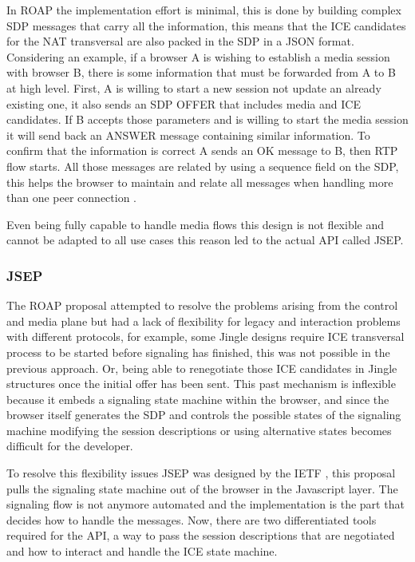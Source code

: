 In ROAP the implementation effort is minimal, this is done by building complex SDP messages that carry all the information, this means that the ICE candidates for the NAT transversal are also packed in the SDP in a JSON format. Considering an example, if a browser A is wishing to establish a media session with browser B, there is some information that must be forwarded from A to B at high level. First, A is willing to start a new session not update an already existing one, it also sends an SDP OFFER that includes media and ICE candidates. If B accepts those parameters and is willing to start the media session it will send back an ANSWER message containing similar information. To confirm that the information is correct A sends an OK message to B, then RTP flow starts. All those messages are related by using a sequence field on the SDP, this helps the browser to maintain and relate all messages when handling more than one peer connection \cite{roapIETF}.

Even being fully capable to handle media flows this design is not flexible and cannot be adapted to all use cases this reason led to the actual API called JSEP.

\subsubsection{JSEP}
The ROAP proposal attempted to resolve the problems arising from the control and media plane but had a lack of flexibility for legacy and interaction problems with different protocols, for example, some Jingle designs require ICE transversal process to be started before signaling has finished, this was not possible in the previous approach. Or, being able to renegotiate those ICE candidates in Jingle structures once the initial offer has been sent. This past mechanism is inflexible because it embeds a signaling state machine within the browser, and since the browser itself generates the SDP and controls the possible states of the signaling machine modifying the session descriptions or using alternative states becomes difficult for the developer.

To resolve this flexibility issues JSEP was designed by the IETF \cite{jsepIETF}, this proposal pulls the signaling state machine out of the browser in the Javascript layer. The signaling flow is not anymore automated and the implementation is the part that decides how to handle the messages. Now, there are two differentiated tools required for the API, a way to pass the session descriptions that are negotiated and how to interact and handle the ICE state machine. 

